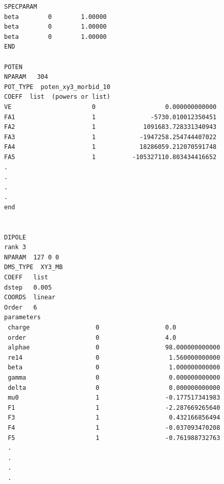 \begin{verbatim}
SPECPARAM
beta        0        1.00000
beta        0        1.00000
beta        0        1.00000
END

POTEN
NPARAM   304
POT_TYPE  poten_xy3_morbid_10
COEFF  list  (powers or list)
VE                      0                   0.000000000000
FA1                     1               -5730.010012350451
FA2                     1             1091683.728331340943
FA3                     1            -1947258.254744407022
FA4                     1            18286059.212070591748
FA5                     1          -105327110.803434416652
.
.
.
.
end
        

DIPOLE
rank 3
NPARAM  127 0 0
DMS_TYPE  XY3_MB
COEFF   list
dstep   0.005
COORDS  linear
Order   6
parameters
 charge                  0                  0.0
 order                   0                  4.0
 alphae                  0                  98.000000000000
 re14                    0                   1.560000000000
 beta                    0                   1.000000000000
 gamma                   0                   0.000000000000
 delta                   0                   0.000000000000
 mu0                     1                  -0.177517341983
 F1                      1                  -2.287669265640
 F3                      1                   0.432166856494
 F4                      1                  -0.037093470208
 F5                      1                  -0.761988732763
 .
 .
 .
 .


\end{verbatim}












